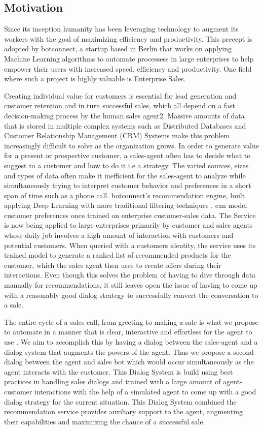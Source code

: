 \documentclass[14pt]{extarticle}
\numberwithin{equation}{section}
\begin{document}
	\subsection{Motivation}
	Since its inception humanity has been leveraging technology to augment its workers with the goal of maximizing efficiency and productivity. This precept is adopted by botconnect, a startup based in Berlin that works on applying Machine Learning algorithms to automate processess in large enterprises to help empower their users with increased speed, efficiency and productivity. One field where such a project is highly valuable is Enterprise Sales. \par
	Creating individual value for customers is essential for lead generation and customer retention and in turn successful sales, which all depend on a fast decision-making process by the human sales agent2. Massive amounts of data that is stored in multiple complex systems such as Distributed Databases and Customer Relationship Management (CRM) Systems make this problem increasingly difficult to solve as the organization grows. In order to generate value for a present or prospective customer, a sales-agent often has to decide what to suggest to a customer and how to do it i.e a strategy. The varied sources, sizes and types of data often make it inefficient for the sales-agent to analyze while simultaneously trying to interpret customer behavior and preferences in a short span of time such as a phone call. botconnect's recommendation engine, built applying Deep Learning with more traditional filtering techniques \cite{ncf2017}, can model customer preferences once trained on enterprise customer-sales data. The Service is now being applied to large enterprises primarily by customer and sales agents whose daily job involves a high amount of interaction with customers and potential customers. \label{plag1} When queried with a customers identity, the service uses its trained model to generate a ranked list of recommended products for the customer, which the sales agent then uses to create offers during their interactions. Even though this solves the problem of having to dive through data manually for recommendations, it still leaves open the issue of having to come up with a reasonably good dialog strategy to successfully convert the conversation to a sale.\par  \label{plag10} 
	The entire cycle of a sales call, from greeting to making a sale is what we propose to automate in a manner that is clear, interactive and effortless for the agent to use \cite{frey2017future}. We aim to accomplish this by having a dialog \cite{Tao_of_CHI} between the sales-agent and a dialog system that augments the powers of the agent. Thus we propose a second dialog between the agent and sales bot which would  occur simultaneously as the agent interacts with the customer. This Dialog System is build using best practices in handling sales dialogs and trained with a large amount of agent-customer interactions with the help of a simulated agent to come up with a good dialog strategy for the current situation. This Dialog System combined the recommendation service provides auxiliary support to the agent, augmenting their capabilities and maximizing the chance of a successful sale. \par
\end{document}
